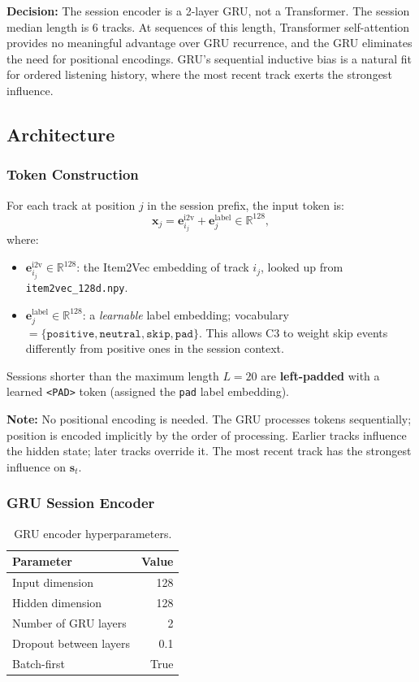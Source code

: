 \documentclass[11pt]{article}
\newcommand{\decision}[1]{\textcolor{decisionblue}{\textbf{Decision:} #1}}
\newcommand{\note}[1]{\textcolor{notegreen}{\textbf{Note:} #1}}
\begin{document}
\decision{The session encoder is a 2-layer GRU, not a Transformer.
The session median length is 6 tracks. At sequences of this length,
Transformer self-attention provides no meaningful advantage over GRU
recurrence, and the GRU eliminates the need for positional encodings.
GRU's sequential inductive bias is a natural fit for ordered listening
history, where the most recent track exerts the strongest influence.}

\subsection{Architecture}

\subsubsection{Token Construction}

For each track at position $j$ in the session prefix, the input token is:
\[
  \mathbf{x}_j
  = \mathbf{e}^{\text{i2v}}_{i_j} + \mathbf{e}^{\text{label}}_j
  \in \mathbb{R}^{128},
\]
where:
\begin{itemize}
  \item $\mathbf{e}^{\text{i2v}}_{i_j} \in \mathbb{R}^{128}$:
        the Item2Vec embedding of track $i_j$,
        looked up from \texttt{item2vec\_128d.npy}.
  \item $\mathbf{e}^{\text{label}}_j \in \mathbb{R}^{128}$:
        a \emph{learnable} label embedding;
        vocabulary $= \{\texttt{positive}, \texttt{neutral},
        \texttt{skip}, \texttt{pad}\}$.
        This allows C3 to weight skip events differently from
        positive ones in the session context.
\end{itemize}

Sessions shorter than the maximum length $L = 20$ are
\textbf{left-padded} with a learned \texttt{<PAD>} token
(assigned the \texttt{pad} label embedding).

\note{No positional encoding is needed. The GRU processes tokens
sequentially; position is encoded implicitly by the order of processing.
Earlier tracks influence the hidden state; later tracks override it.
The most recent track has the strongest influence on $\mathbf{s}_t$.}

\subsubsection{GRU Session Encoder}

\begin{table}[H]
\centering
\caption{GRU encoder hyperparameters.}
\begin{tabular}{lr}
\toprule
\textbf{Parameter} & \textbf{Value} \\
\midrule
Input dimension & 128 \\
Hidden dimension & 128 \\
Number of GRU layers & 2 \\
Dropout between layers & 0.1 \\
Batch-first & True \\
\bottomrule
\end{tabular}
\end{table}
\end{document}
